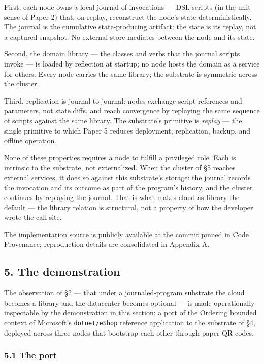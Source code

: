 \documentclass[
]{article}
\begin{document}
First, each node owns a local journal of invocations --- DSL scripts (in
the unit sense of Paper 2) that, on replay, reconstruct the node's state
deterministically. The journal is the cumulative state-producing
artifact; the state is its replay, not a captured snapshot. No external
store mediates between the node and its state.

Second, the domain library --- the classes and verbs that the journal
scripts invoke --- is loaded by reflection at startup; no node hosts the
domain as a service for others. Every node carries the same library; the
substrate is symmetric across the cluster.

Third, replication is journal-to-journal: nodes exchange script
references and parameters, not state diffs, and reach convergence by
replaying the same sequence of scripts against the same library. The
substrate's primitive is \emph{replay} --- the single primitive to which
Paper 5 reduces deployment, replication, backup, and offline operation.

None of these properties requires a node to fulfill a privileged role.
Each is intrinsic to the substrate, not externalized. When the cluster
of §5 reaches external services, it does so against this substrate's
storage: the journal records the invocation and its outcome as part of
the program's history, and the cluster continues by replaying the
journal. That is what makes cloud-as-library the default --- the library
relation is structural, not a property of how the developer wrote the
call site.

The implementation source is publicly available at the commit pinned in
Code Provenance; reproduction details are consolidated in Appendix A.

\subsection{5. The demonstration}\label{the-demonstration}

The observation of §2 --- that under a journaled-program substrate the
cloud becomes a library and the datacenter becomes optional --- is made
operationally inspectable by the demonstration in this section: a port
of the Ordering bounded context of Microsoft's \texttt{dotnet/eShop}
reference application to the substrate of §4, deployed across three
nodes that bootstrap each other through paper QR codes.

\subsubsection{5.1 The port}\label{the-port}
\end{document}
